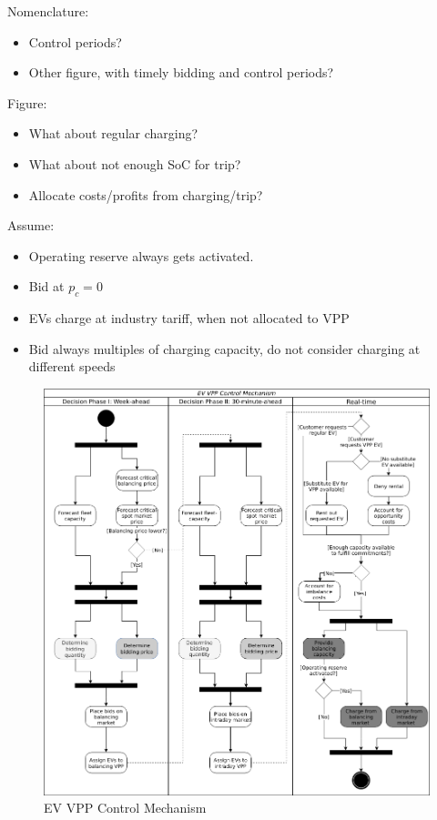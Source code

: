 \documentclass[a4paper, 12pt]{article}
\begin{document}
Nomenclature:
\begin{itemize}
\item Control periods?
\item Other figure, with timely bidding and control periods?
\end{itemize}

Figure:
\begin{itemize}
\item What about regular charging?
\item What about not enough SoC for trip?
\item Allocate costs/profits from charging/trip?
\end{itemize}

Assume:
\begin{itemize}
\item Operating reserve always gets activated.
\item Bid at \(p_c = 0\)
\item EVs charge at industry tariff, when not allocated to VPP
\item Bid always multiples of charging capacity, do not consider charging at
different speeds
\end{itemize}

\begin{figure}[htbp]
\centering
\includegraphics[width=0.95\linewidth]{./fig/control_mechanism.png}
\caption[EV VPP Control Mechanism]{EV VPP Control Mechanism \label{fig-control-mechanism}}
\end{figure}
\end{document}
